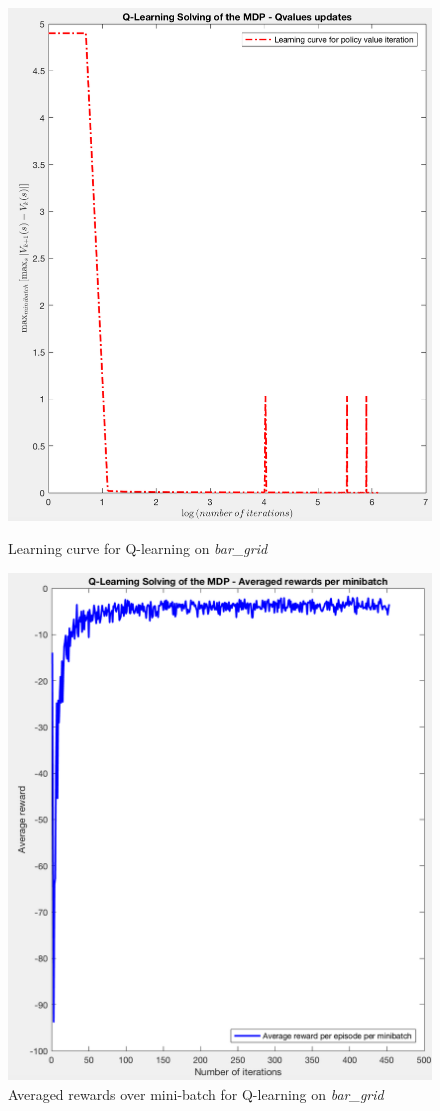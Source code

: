 \documentclass[a4paper]{report}
\begin{document}
{{{				\begin{figure}[ht!]
					\begin{minipage}{0.4\linewidth}
						\includegraphics[width=0.9\linewidth]{bargrid_ql_learning_curve}
						\caption{Learning curve for Q-learning on \emph{bar\_grid}}
					\end{minipage}
					\hfill
					\begin{minipage}{0.4\linewidth}
						\includegraphics[width=0.9\linewidth]{bargrid_ql_averaged_rewards}
						\caption{Averaged rewards over mini-batch for Q-learning on \emph{bar\_grid}}
					\end{minipage}
				\end{figure}
}}}
\end{document}
